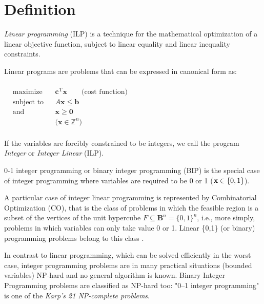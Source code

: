 \section{Definition} 
\textit{Linear programming} (ILP) is a technique for the mathematical optimization of a linear objective function, subject to linear equality and linear inequality constraints.

Linear programs are problems that can be expressed in canonical form as:
\paragraph{}

${\displaystyle {\begin{aligned}
	&{\text{maximize}}&&\mathbf {c} ^{\mathrm {T} }\mathbf {x} \qquad \text{(cost function)}
	\\&{\text{subject to}}&&A\mathbf {x} \leq \mathbf {b}
	\\&{\text{and}}&&\mathbf {x} \geq \mathbf {0}
	\\&&&{\text{(}}\mathbf {x} \in \mathbb {Z} ^{n}\text{)}
	\\&
	\end{aligned}}} $


If the variables are forcibly constrained to be integers, we call the program \textit{Integer} or \textit{Integer Linear} (ILP).

0-1 integer programming or binary integer programming (BIP) is the special case of integer programming where variables are required to be 0 or 1 ($\mathbf {x} \in \mathbb \{0,1\} $).

A particular case of integer linear programming is represented by Combinatorial Optimization (CO), that is the class of problems in which the feasible region is a subset of the vertices of the unit hypercube $F \subseteq \textbf{B}^{n} = \{0,1\}^{n} $, i.e., more simply, problems in which variables can only take value 0 or 1. Linear \{0,1\} (or binary) programming problems belong to this class \cite{ro-malucelli}.

In contrast to linear programming, which can be solved efficiently in the worst case, integer programming problems are in many practical situations (bounded variables) NP-hard and no general algorithm is known. Binary Integer Programming problems are classified as NP-hard too: "0–1 integer programming" is one of the \textit{Karp's 21 NP-complete problems}.

